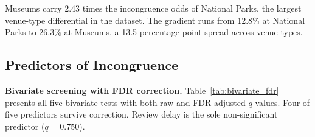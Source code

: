 \documentclass[conference]{IEEEtran}
\begin{document}
\begin{table}[htbp]
\caption{Incongruence Rate by Venue Type, Ranked (Reference: National Parks)}
\label{tab:venue_type_incongruence}
\centering
{}
\end{table}

Museums carry 2.43 times the incongruence odds of National Parks, the largest venue-type differential in the dataset. The gradient runs from 12.8\% at National Parks to 26.3\% at Museums, a 13.5 percentage-point spread across venue types.

\subsection{Predictors of Incongruence}
\textbf{Bivariate screening with FDR correction.} Table~\ref{tab:bivariate_fdr} presents all five bivariate tests with both raw and FDR-adjusted $q$-values. Four of five predictors survive correction. Review delay is the sole non-significant predictor ($q=0.750$).

\begin{table}[htbp]
\caption{Bivariate Predictor Screening with Benjamini-Hochberg FDR Correction}
\label{tab:bivariate_fdr}
\centering
{}
\end{table}
\end{document}
